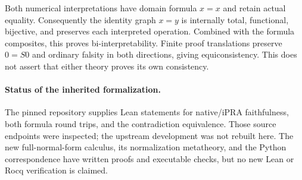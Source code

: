 Both numerical interpretations have domain formula $x=x$ and retain
actual equality. Consequently the identity graph $x=y$ is internally
total, functional, bijective, and preserves each interpreted operation.
Combined with the formula composites, this proves bi-interpretability.
Finite proof translations preserve $0=S0$ and ordinary falsity in both
directions, giving equiconsistency. This does not assert that either
theory proves its own consistency.

\paragraph{Status of the inherited formalization.}
The pinned repository supplies Lean statements for native/iPRA
faithfulness, both formula round trips, and the contradiction equivalence.
Those source endpoints were inspected; the upstream development was
not rebuilt here. The new full-normal-form calculus, its normalization
metatheory, and the Python correspondence have written proofs and
executable checks, but no new Lean or Rocq verification is claimed.

